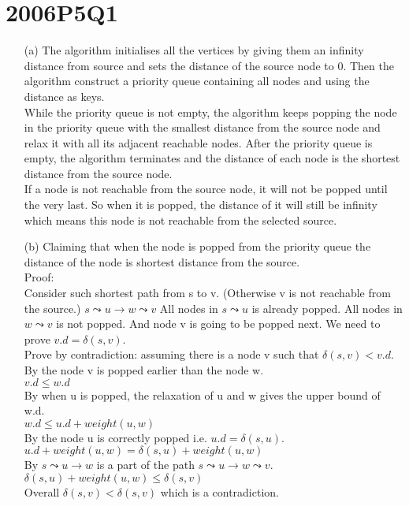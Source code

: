 \documentclass[10pt,twoside,a4paper]{article}
\begin{document}
\section{2006P5Q1}
\begin{itemize}
\item[(a)]
The algorithm initialises all the vertices by giving them an infinity distance from source and sets the distance of the source node to 0. Then the algorithm construct a priority queue containing all nodes and using the distance as keys.
\\While the priority queue is not empty, the algorithm keeps popping the node in the priority queue with the smallest distance from the source node and relax it with all its adjacent reachable nodes. After the priority queue is empty, the algorithm terminates and the distance of each node is the shortest distance from the source node.
\\If a node is not reachable from the source node, it will not be popped until the very last. So when it is popped, the distance of it will still be infinity which means this node is not reachable from the selected source.
\item[(b)]
Claiming that when the node is popped from the priority queue the distance of the node is shortest distance from the source.
\\Proof:
\\Consider such shortest path from s to v. (Otherwise v is not reachable from the source.) $s\leadsto u\rightarrow w\leadsto v$ All nodes in $s\leadsto u$ is already popped. All nodes in $w\leadsto v$ is not popped. And node v is going to be popped next. We need to prove $v.d = \delta(s,v)$.
\\Prove by contradiction: assuming there is a node v such that $\delta(s,v) < v.d$.
\\By the node v is popped earlier than the node w.
\\$v.d \leq w.d$ 
\\By when u is popped, the relaxation of u and w gives the upper bound of w.d.
\\$w.d \leq u.d + weight(u,w)$ 
\\By the node u is correctly popped i.e. $u.d = \delta(s,u)$.
\\$u.d + weight(u,w) = \delta(s,u) + weight(u,w)$ 
\\By $s\leadsto u\rightarrow w$ is a part of the path $s\leadsto u\rightarrow w\leadsto v$.
\\$\delta(s,u) + weight(u,w) \leq \delta(s,v)$
\\Overall $\delta(s,v) < \delta(s,v)$ which is a contradiction.

\end{itemize}
\end{document}
